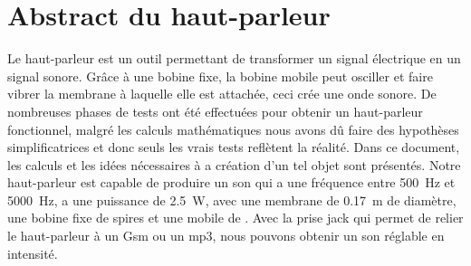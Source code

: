 

\section{Abstract du haut-parleur}

Le haut-parleur est un outil permettant de transformer un signal électrique en un signal sonore.  Grâce à une bobine fixe, la bobine mobile peut osciller et faire vibrer la membrane à laquelle elle est attachée, ceci crée une onde sonore.
De nombreuses phases de tests ont été effectuées pour obtenir un haut-parleur fonctionnel, malgré les calculs mathématiques nous avons dû faire des hypothèses simplificatrices et donc seuls les vrais tests reflètent la réalité.
Dans ce document, les calculs et les idées nécessaires à a création d’un tel objet sont présentés.  
Notre haut-parleur est capable de produire un son qui a une fréquence entre \SI{500}{\hertz} et \SI{5000}{\hertz}, a une puissance de \SI{2.5}{\watt}, avec une membrane de \SI{0.17}{\meter} de diamètre, une bobine fixe de  spires et une mobile de . Avec la prise jack qui permet de relier le haut-parleur à un Gsm ou un mp3, nous pouvons obtenir un son réglable en intensité.


